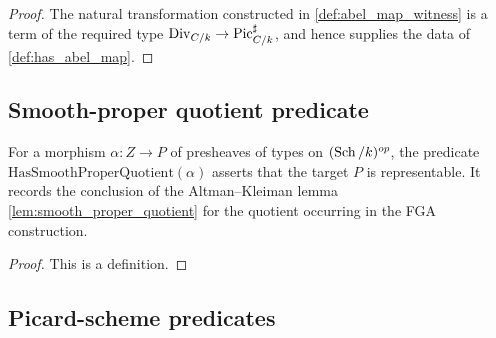 \begin{proof}
\leanok
  The natural transformation constructed in \cref{def:abel_map_witness} is a
  term of the required type
  \(\mathrm{Div}_{C/k} \to \operatorname{Pic}^\sharp_{C/k}\), and hence supplies the data of
  \cref{def:has_abel_map}.
\end{proof}

\subsection{Smooth-proper quotient predicate}
\label{subsec:fga_pic_quotient_carrier}

\begin{definition}\leanok
  \label{def:has_smooth_proper_quotient}
  For a morphism \(\alpha : Z \to P\) of presheaves of types on
  \((\operatorname{Sch}/k)^{op}\), the predicate \(\mathrm{HasSmoothProperQuotient}(\alpha)\)
  asserts that the target \(P\) is representable. It records the conclusion
  of the Altman--Kleiman lemma \cref{lem:smooth_proper_quotient} for the
  quotient occurring in the FGA construction.
\end{definition}

\begin{proof}\leanok
  This is a definition.
\end{proof}

\subsection{Picard-scheme predicates}
\label{subsec:fga_pic_scheme_carriers}

